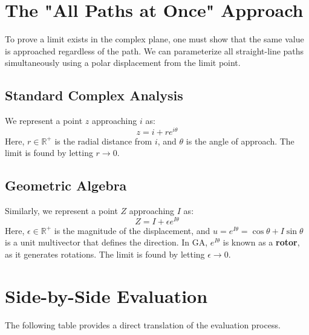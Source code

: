 \documentclass[11pt, a4paper]{article}
\begin{document}
\section{The "All Paths at Once" Approach}
To prove a limit exists in the complex plane, one must show that the same value is approached regardless of the path. We can parameterize all straight-line paths simultaneously using a polar displacement from the limit point.

\subsection{Standard Complex Analysis}
We represent a point $z$ approaching $i$ as:
$$ z = i + re^{i\theta} $$
Here, $r \in \mathbb{R}^+$ is the radial distance from $i$, and $\theta$ is the angle of approach. The limit is found by letting $r \to 0$.

\subsection{Geometric Algebra}
Similarly, we represent a point $Z$ approaching $I$ as:
$$ Z = I + \epsilon e^{I\theta} $$
Here, $\epsilon \in \mathbb{R}^+$ is the magnitude of the displacement, and $u = e^{I\theta} = \cos\theta + I\sin\theta$ is a unit multivector that defines the direction. In GA, $e^{I\theta}$ is known as a \textbf{rotor}, as it generates rotations. The limit is found by letting $\epsilon \to 0$.

\section{Side-by-Side Evaluation}
The following table provides a direct translation of the evaluation process.

\bigskip %
\end{document}
